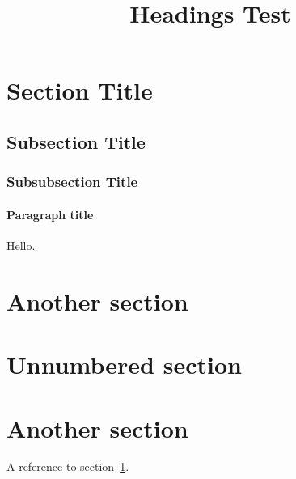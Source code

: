 \documentclass{article}
\begin{document}
  \title{Headings Test}
  \maketitle

  \section{Section Title} \label{first-section}

  \subsection{Subsection Title}

  \subsubsection{Subsubsection Title}

  \paragraph{Paragraph title}

  Hello.

  \section{Another section}

  \section*{Unnumbered section}

  \section{Another section}

  A reference to section~\ref{first-section}.
\end{document}
